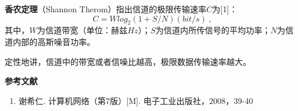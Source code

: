 

\textbf{香农定理}（Shannon Therom）指出信道的极限传输速率$C$为[1]：
\begin{equation}
C=Wlog_2(1+S/N)    (bit/s)~,
\end{equation}
其中，$W$为信道带宽（单位：赫兹$Hz$）；$S$为信道内所传信号的平均功率；$N$为信道内部的高斯噪音功率。

定性地讲，信道中的带宽或者信噪比越高，极限数据传输速率越大。


\textbf{参考文献}
\begin{enumerate}
\item 谢希仁. 计算机网络（第7版）[M]. 电子工业出版社，2008，39-40
\end{enumerate}